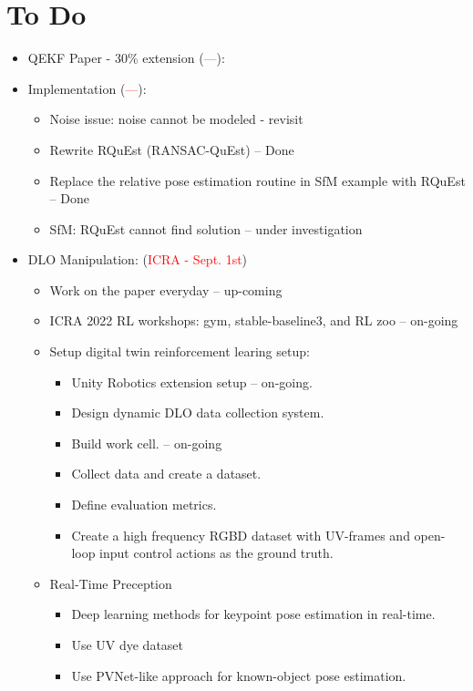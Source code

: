 \documentclass[11pt]{article}
\begin{document}
\section{To Do}
\begin{itemize}
  \item QEKF Paper - 30\% extension (\textcolor{red}{---}):
  \item Implementation (\textcolor{red}{---}):
  \begin{itemize}
      \item Noise issue: noise cannot be modeled - revisit
      \item Rewrite RQuEst (RANSAC-QuEst) -- Done
      \item Replace the relative pose estimation routine in SfM example with RQuEst -- Done
      \item SfM: RQuEst cannot find solution -- under investigation
  \end{itemize}
  \item  DLO Manipulation: (\textcolor{red}{ICRA - Sept. 1st})
  \begin{itemize}
      \item Work on the paper everyday -- up-coming
      \item ICRA 2022 RL workshops: gym, stable-baseline3, and RL zoo -- on-going
      \item Setup digital twin reinforcement learing setup:
      \begin{itemize}
        \item Unity Robotics extension setup -- on-going.
        \item Design dynamic DLO data collection system.
        \item Build work cell. -- on-going
        \item Collect data and create a dataset.
        \item Define evaluation metrics.
        \item Create a high frequency RGBD dataset with UV-frames and open-loop input control actions as the ground truth.
      \end{itemize}
      \item Real-Time Preception
      \begin{itemize}
        \item Deep learning methods for keypoint pose estimation in real-time.
        \item Use UV dye dataset
        \item Use PVNet-like approach for known-object pose estimation.

\end{itemize}
\end{itemize}
\end{itemize}
\end{document}
